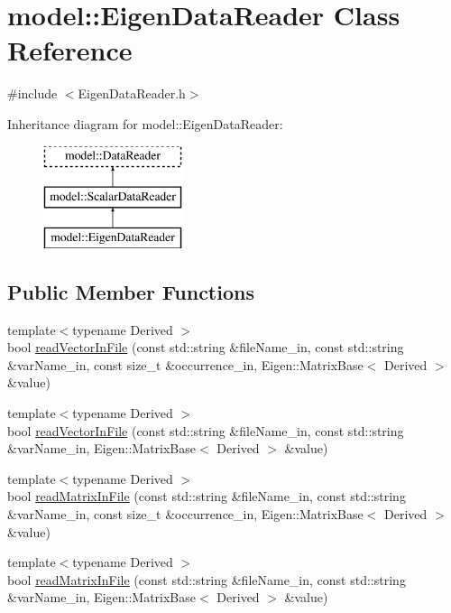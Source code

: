 \hypertarget{classmodel_1_1_eigen_data_reader}{}\section{model\+:\+:Eigen\+Data\+Reader Class Reference}
\label{classmodel_1_1_eigen_data_reader}


{\ttfamily \#include $<$Eigen\+Data\+Reader.\+h$>$}

Inheritance diagram for model\+:\+:Eigen\+Data\+Reader\+:\begin{figure}[H]
\begin{center}
\leavevmode
\includegraphics[height=3.000000cm]{classmodel_1_1_eigen_data_reader}
\end{center}
\end{figure}
\subsection*{Public Member Functions}
\begin{DoxyCompactItemize}
\item 
{\footnotesize template$<$typename Derived $>$ }\\bool \hyperlink{classmodel_1_1_eigen_data_reader_a11e5f64cac7eba454eb2b64048b903b0}{read\+Vector\+In\+File} (const std\+::string \&file\+Name\+\_\+in, const std\+::string \&var\+Name\+\_\+in, const size\+\_\+t \&occurrence\+\_\+in, Eigen\+::\+Matrix\+Base$<$ Derived $>$ \&value)
\item 
{\footnotesize template$<$typename Derived $>$ }\\bool \hyperlink{classmodel_1_1_eigen_data_reader_a828cb711b221db48d1d686cc931d2ff7}{read\+Vector\+In\+File} (const std\+::string \&file\+Name\+\_\+in, const std\+::string \&var\+Name\+\_\+in, Eigen\+::\+Matrix\+Base$<$ Derived $>$ \&value)
\item 
{\footnotesize template$<$typename Derived $>$ }\\bool \hyperlink{classmodel_1_1_eigen_data_reader_a96f7ef87e60676ec60bba05edc0296f5}{read\+Matrix\+In\+File} (const std\+::string \&file\+Name\+\_\+in, const std\+::string \&var\+Name\+\_\+in, const size\+\_\+t \&occurrence\+\_\+in, Eigen\+::\+Matrix\+Base$<$ Derived $>$ \&value)
\item 
{\footnotesize template$<$typename Derived $>$ }\\bool \hyperlink{classmodel_1_1_eigen_data_reader_ac26c839a5ad63b23476ccb28e6b8f2a1}{read\+Matrix\+In\+File} (const std\+::string \&file\+Name\+\_\+in, const std\+::string \&var\+Name\+\_\+in, Eigen\+::\+Matrix\+Base$<$ Derived $>$ \&value)
\end{DoxyCompactItemize}


